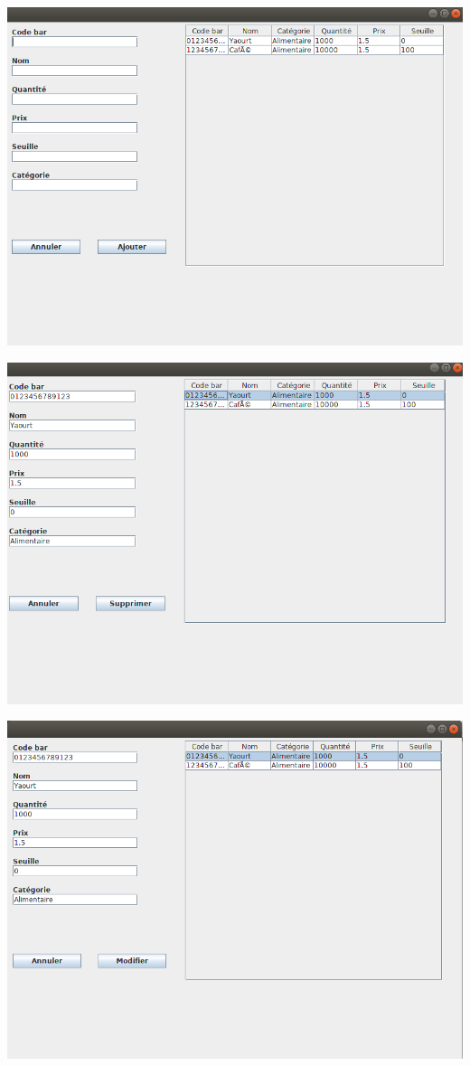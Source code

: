 \documentclass[french,10pt,a4paper]{report}
\begin{document}
\begin{center}
	\includegraphics[scale=0.4]{captures/5_swing.png}
\end{center}
\begin{center}
	\includegraphics[scale=0.4]{captures/6_swing.png}
\end{center}
\begin{center}
	\includegraphics[scale=0.4]{captures/7_swing.png}
\end{center}
\end{document}
